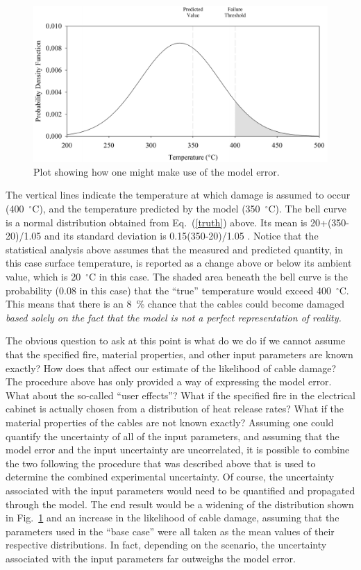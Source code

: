 \begin{figure}[ht]
\begin{center}
\includegraphics[width=5.in]{FIGURES/bell_curve}
\end{center}
\caption[Demonstration of model error.]{Plot showing how one might make use of the model error.}
\label{bell_curve}
\end{figure}

The vertical lines indicate the temperature at which damage is assumed to occur (400~$^\circ$C), and the temperature predicted by the
model (350~$^\circ$C). The bell curve is a normal distribution obtained from Eq.~(\ref{truth}) above. Its mean is 20+(350-20)/1.05 and its standard deviation
is 0.15(350-20)/1.05 . Notice that the statistical analysis
above assumes that the measured and predicted quantity, in this case surface temperature, is reported as a change above or below its ambient value, which is
20~$^\circ$C in this case. The shaded area beneath the bell curve is the probability (0.08 in this case) that the ``true'' temperature would exceed 400~$^\circ$C.
This means that there is an 8~\% chance that the cables could
become damaged {\em based solely on the fact that the model is not a perfect representation of reality.}

The obvious question to ask at this point is what do we do if we cannot assume that the specified fire, material properties, and other input parameters are
known exactly? How does that affect our estimate of the likelihood of cable damage? The procedure above has only provided a way of expressing the model
error. What about the so-called ``user effects''? What if the specified fire in the electrical cabinet is actually chosen from a distribution of heat release rates?
What if the material properties of the cables are not known exactly? Assuming one could quantify the uncertainty of all of the input parameters, and assuming that the model error
and the input uncertainty are uncorrelated, it is possible to combine the two following the procedure that was described above that is used to determine the combined
experimental uncertainty. Of
course, the uncertainty associated with the input parameters would need to be quantified and propagated through the model. The end result would be a widening of
the distribution shown in Fig.~\ref{bell_curve} and an increase in the likelihood of cable damage, assuming that the parameters used in the ``base case'' were
all taken as the mean values of their respective distributions. In fact, depending on the scenario, the uncertainty associated with the input parameters far outweighs
the model error.


